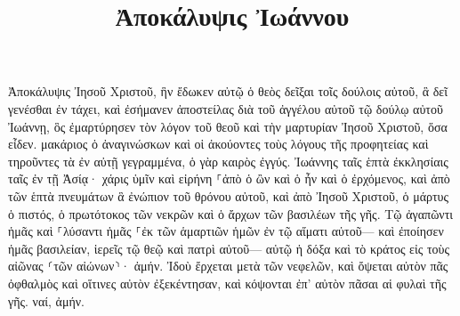 \documentclass{openreader}
\title{Ἀποκάλυψις Ἰωάννου }
\date{}
\begin{document}
\maketitle
\raggedbottom 
\fontsize{16pt}{24pt}\selectfont


Ἀποκάλυψις Ἰησοῦ Χριστοῦ, ἣν ἔδωκεν αὐτῷ ὁ θεὸς δεῖξαι τοῖς δούλοις αὐτοῦ, ἃ δεῖ γενέσθαι ἐν τάχει, καὶ ἐσήμανεν ἀποστείλας διὰ τοῦ ἀγγέλου αὐτοῦ τῷ δούλῳ αὐτοῦ Ἰωάννῃ, 
ὃς ἐμαρτύρησεν τὸν λόγον τοῦ θεοῦ καὶ τὴν μαρτυρίαν Ἰησοῦ Χριστοῦ, ὅσα εἶδεν. 
μακάριος ὁ ἀναγινώσκων καὶ οἱ ἀκούοντες τοὺς λόγους τῆς προφητείας καὶ τηροῦντες τὰ ἐν αὐτῇ γεγραμμένα, ὁ γὰρ καιρὸς ἐγγύς. 
Ἰωάννης ταῖς ἑπτὰ ἐκκλησίαις ταῖς ἐν τῇ Ἀσίᾳ· χάρις ὑμῖν καὶ εἰρήνη ⸀ἀπὸ ὁ ὢν καὶ ὁ ἦν καὶ ὁ ἐρχόμενος, καὶ ἀπὸ τῶν ἑπτὰ πνευμάτων ἃ ἐνώπιον τοῦ θρόνου αὐτοῦ, 
καὶ ἀπὸ Ἰησοῦ Χριστοῦ, ὁ μάρτυς ὁ πιστός, ὁ πρωτότοκος τῶν νεκρῶν καὶ ὁ ἄρχων τῶν βασιλέων τῆς γῆς. Τῷ ἀγαπῶντι ἡμᾶς καὶ ⸀λύσαντι ἡμᾶς ⸀ἐκ τῶν ἁμαρτιῶν ἡμῶν ἐν τῷ αἵματι αὐτοῦ— 
καὶ ἐποίησεν ἡμᾶς βασιλείαν, ἱερεῖς τῷ θεῷ καὶ πατρὶ αὐτοῦ— αὐτῷ ἡ δόξα καὶ τὸ κράτος εἰς τοὺς αἰῶνας ⸂τῶν αἰώνων⸃· ἀμήν. 
Ἰδοὺ ἔρχεται μετὰ τῶν νεφελῶν, καὶ ὄψεται αὐτὸν πᾶς ὀφθαλμὸς καὶ οἵτινες αὐτὸν ἐξεκέντησαν, καὶ κόψονται ἐπ’ αὐτὸν πᾶσαι αἱ φυλαὶ τῆς γῆς. ναί, ἀμήν. 
\end{document}
